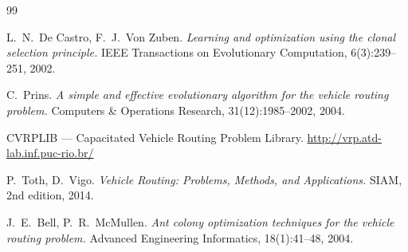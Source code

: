 \documentclass[a4paper,12pt]{article}
\begin{document}

\begin{thebibliography}{99}

L.~N.~De Castro, F.~J.~Von Zuben.
\emph{Learning and optimization using the clonal selection principle.}
IEEE Transactions on Evolutionary Computation, 6(3):239--251, 2002.

C.~Prins.
\emph{A simple and effective evolutionary algorithm for the vehicle routing problem.}
Computers \& Operations Research, 31(12):1985--2002, 2004.

CVRPLIB --- Capacitated Vehicle Routing Problem Library.
\url{http://vrp.atd-lab.inf.puc-rio.br/}

P.~Toth, D.~Vigo.
\emph{Vehicle Routing: Problems, Methods, and Applications.}
SIAM, 2nd edition, 2014.

J.~E.~Bell, P.~R.~McMullen.
\emph{Ant colony optimization techniques for the vehicle routing problem.}
Advanced Engineering Informatics, 18(1):41--48, 2004.

\end{thebibliography}
\end{document}
